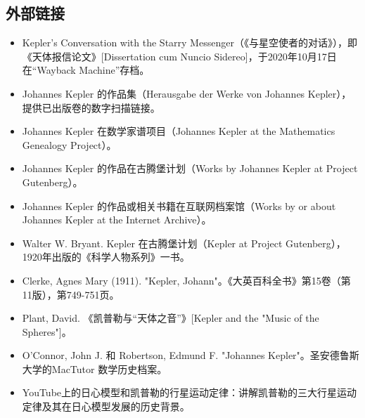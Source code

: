 \subsection{外部链接}
\begin{itemize}
\item Kepler's Conversation with the Starry Messenger（《与星空使者的对话》），即《天体报信论文》[Dissertation cum Nuncio Sidereo]，于2020年10月17日在“Wayback Machine”存档。
\item Johannes Kepler 的作品集（Herausgabe der Werke von Johannes Kepler），提供已出版卷的数字扫描链接。
\item Johannes Kepler 在数学家谱项目（Johannes Kepler at the Mathematics Genealogy Project）。
\item Johannes Kepler 的作品在古腾堡计划（Works by Johannes Kepler at Project Gutenberg）。
\item Johannes Kepler 的作品或相关书籍在互联网档案馆（Works by or about Johannes Kepler at the Internet Archive）。
\item Walter W. Bryant. Kepler 在古腾堡计划（Kepler at Project Gutenberg），1920年出版的《科学人物系列》一书。
\item Clerke, Agnes Mary (1911). "Kepler, Johann"。《大英百科全书》第15卷（第11版），第749-751页。
\item Plant, David. 《凯普勒与“天体之音”》[Kepler and the "Music of the Spheres"]。
\item O'Connor, John J. 和 Robertson, Edmund F. "Johannes Kepler"。圣安德鲁斯大学的MacTutor 数学历史档案。
\item YouTube上的日心模型和凯普勒的行星运动定律：讲解凯普勒的三大行星运动定律及其在日心模型发展的历史背景。
\end{itemize}